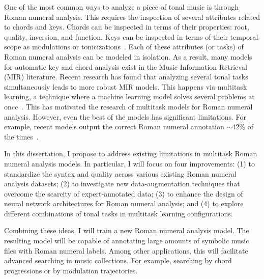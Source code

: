 
One of the most common ways to analyze a piece of tonal music is through Roman numeral analysis.
This requires the inspection of several attributes related to chords and keys.
Chords can be inspected in terms of their properties: root, quality, inversion, and function.
Keys can be inspected in terms of their temporal scope as modulations or tonicizations~\cite{napoles_lopez_local_2020}.
Each of these attributes (or tasks) of Roman numeral analysis can be modeled in isolation.
As a result, many models for automatic key and chord analysis exist in the Music Information Retrieval (MIR) literature.
Recent research has found that analyzing several tonal tasks simultaneously leads to more robust MIR models.
This happens via multitask learning, a technique where a machine learning model solves several problems at once~\cite{ruder_overview_2017}.
This has motivated the research of multitask models for Roman numeral analysis.
However, even the best of the models has significant limitations.
For example, recent models output the correct Roman numeral annotation $\sim$42\% of the times~\cite{chen_attend_2021, micchi_not_2020}.

In this dissertation, I propose to address existing limitations in multitask Roman numeral analysis models.
In particular, I will focus on four improvements:
(1) to standardize the syntax and quality across various existing Roman numeral analysis datasets;
(2) to investigate new data-augmentation techniques that overcome the scarcity of expert-annotated data;
(3) to enhance the design of neural network architectures for Roman numeral analysis;
and (4) to explore different combinations of tonal tasks in multitask learning configurations.

Combining these ideas, I will train a new Roman numeral analysis model.
The resulting model will be capable of annotating large amounts of symbolic music files with Roman numeral labels.
Among other applications, this will facilitate advanced searching in music collections.
For example, searching by chord progressions or by modulation trajectories.
